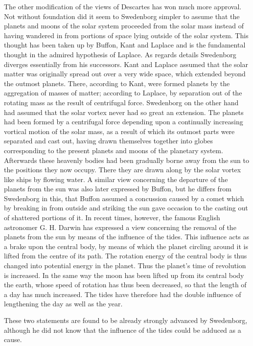 \documentclass[a4paper, 11pt, oneside, polutonikogreek, english]{article}
\begin{document}
The other modification of the views of Descartes has won much more approval. Not without foundation did it seem to Swedenborg simpler to assume that the planets and moons of the solar system proceeded from the solar mass instead of having wandered in from portions of space lying outside of the solar system. This thought has been taken up by Buffon, Kant and Laplace and is the fundamental thought in the admired hypothesis of Laplace. As regards details Swedenborg diverges essentially from his successors. Kant and Laplace assumed that the solar matter was originally spread out over a very wide space, which extended beyond the outmost planets. There, according to Kant, were formed planets by the aggregation of masses of matter; according to Laplace, by separation out of the rotating mass as the result of centrifugal force. Swedenborg on the other hand had assumed that the solar vortex never had so great an extension. The planets had been formed by a centrifugal force depending upon a continually increasing vortical motion of the solar mass, as a result of which its outmost parts were separated and cast out, having drawn themselves together into globes corresponding to the present planets and moons of the planetary system. Afterwards these heavenly bodies had been gradually borne away from the sun to the positions they now occupy. There they are drawn along by the solar vortex like ships by flowing water. A similar view concerning the departure of the planets from the sun was also later expressed by Buffon, but he differs from Swedenborg in this, that Buffon assumed a concussion caused by a comet which by breaking in from outside and striking the sun gave occasion to the casting out of shattered portions of it. In recent times, however, the famous English astronomer G. H. Darwin has expressed a view concerning the removal of the planets from the sun by means of the influence of the tides. This influence acts as a brake upon the central body, by means of which the planet circling around it is lifted from the centre of its path. The rotation energy of the central body is thus changed into potential energy in the planet. Thus the planet's time of revolution is increased. In the same way the moon has been lifted up from its central body the earth, whose speed of rotation has thus been decreased, so that the length of a day has much increased. The tides have therefore had the double influence of lengthening the day as well as the year.

These two statements are found to be already strongly advanced by Swedenborg, although he did not know that the influence of the tides could be adduced as a cause.
\end{document}
